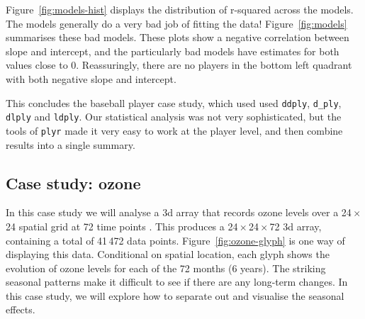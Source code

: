 \documentclass{scrartcl}
\newcommand{\x}{\,$\times$\,}
\begin{document}
Figure~\ref{fig:models-hist} displays the distribution of r-squared across the models.  The models generally do a very bad job of fitting the data!  
Figure~\ref{fig:models} summarises these bad models.  These plots show a negative correlation between slope and intercept, and the particularly bad models have estimates for both values close to 0.  Reassuringly, there are no players in the bottom left quadrant with both negative slope and intercept.

% 


% 


This concludes the baseball player case study, which used used {\tt ddply}, {\tt d\_ply}, {\tt dlply} and {\tt ldply}.  Our statistical analysis was not very sophisticated, but the tools of {\tt plyr} made it very easy to work at the player level, and then combine results into a single summary.  

\subsection{Case study: ozone}
\label{sub:ozone}

In this case study we will analyse a 3d array that records ozone levels over a 24\x24 spatial grid at 72 time points \citep{hobbs:2007}.  This produces a 24\x24\x72 3d array, containing a total of 41\,472 data points.  Figure~\ref{fig:ozone-glyph} is one way of displaying this data.  Conditional on spatial location, each glyph shows the evolution of ozone levels for each of the 72 months (6 years).  The striking seasonal patterns make it difficult to see if there are any long-term changes.  In this case study, we will explore how to separate out and visualise the seasonal effects.
\end{document}
